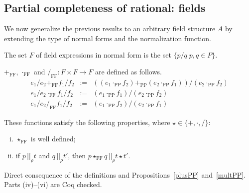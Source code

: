 \documentclass[numreferences]{kluwer}
\newcommand{\intII}{\,]\![}
\newcommand{\intrel}{\mathbin{\intII_{\rho}}}
\newcommand{\tacticname}[1]{\textsf{#1}}
\newcommand{\rational}{\tacticname{rational}}
\newcommand{\plusPP}{\ensuremath{+_{\mathrm{PP}}}}
\newcommand{\multPP}{\ensuremath{\cdot_{\mathrm{PP}}}}
\newcommand{\plusFF}{\ensuremath{+_{\mathrm{FF}}}}
\newcommand{\multFF}{\ensuremath{\cdot_{\mathrm{FF}}}}
\newcommand{\divFF}{\ensuremath{/_{\mathrm{FF}}}}
\newcommand{\starFF}{\ensuremath{\star_{\mathrm{FF}}}}
\begin{document}
\begin{article}
\section{Partial completeness of {\rational}: fields}\label{fields}

We now generalize the previous results to an
arbitrary field structure $A$
by extending the type of normal forms and the normalization function.

\begin{definition}\label{defn:NF} The set $F$ of field expressions in
normal form is the set $\{p/q|p,q\in P\}$.
\end{definition}

\begin{definition}\label{defn:plusFF}\label{defn:multFF}\label{defn:divFF}
{\plusFF}, {\multFF} and $\divFF:F\times F\to F$ are defined as follows.
\begin{eqnarray*}
e_1/e_2 \plusFF f_1/f_2 & := &
 \left((e_1\multPP f_2)\plusPP(e_2\multPP f_1)\right)/(e_2\multPP f_2) \\
e_1/e_2 \multFF f_1/f_2 & := & (e_1\multPP f_1)/(e_2\multPP f_2) \\
e_1/e_2 \divFF f_1/f_2 & := & (e_1\multPP f_2)/(e_2\multPP f_1)
\end{eqnarray*}
\end{definition}

\begin{proposition}\label{plusFF}\label{multFF}\label{divFF}
These functions satisfy the following properties, where $\star\in\{+,\cdot,/\}$:
\begin{enumerate}[(i)]
\item {\starFF} is well defined;
\item if $p\intrel t$ and $q\intrel t'$, then $p\starFF q\intrel t\star t'$.
\end{enumerate}
\end{proposition}
\begin{pf}
Direct consequence of the definitions and Propositions~\ref{plusPP}
and~\ref{multPP}.  Parts (iv)--(vi) are Coq checked.
\end{pf}


\end{article}
\end{document}
